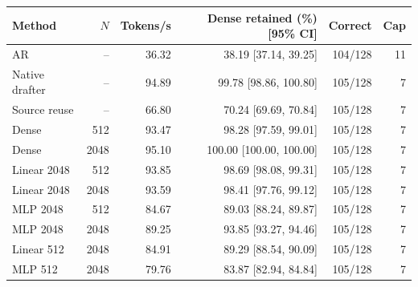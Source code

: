 \begin{tabular}{lrrrrr}
\toprule
Method & $N$ & Tokens/s & Dense retained (\%) [95\% CI] & Correct & Cap \\
\midrule
AR & -- & 36.32 & 38.19 [37.14, 39.25] & 104/128 & 11 \\
Native drafter & -- & 94.89 & 99.78 [98.86, 100.80] & 105/128 & 7 \\
Source reuse & -- & 66.80 & 70.24 [69.69, 70.84] & 105/128 & 7 \\
Dense & 512 & 93.47 & 98.28 [97.59, 99.01] & 105/128 & 7 \\
Dense & 2048 & 95.10 & 100.00 [100.00, 100.00] & 105/128 & 7 \\
Linear 2048 & 512 & 93.85 & 98.69 [98.08, 99.31] & 105/128 & 7 \\
Linear 2048 & 2048 & 93.59 & 98.41 [97.76, 99.12] & 105/128 & 7 \\
MLP 2048 & 512 & 84.67 & 89.03 [88.24, 89.87] & 105/128 & 7 \\
MLP 2048 & 2048 & 89.25 & 93.85 [93.27, 94.46] & 105/128 & 7 \\
Linear 512 & 2048 & 84.91 & 89.29 [88.54, 90.09] & 105/128 & 7 \\
MLP 512 & 2048 & 79.76 & 83.87 [82.94, 84.84] & 105/128 & 7 \\
\bottomrule
\end{tabular}
